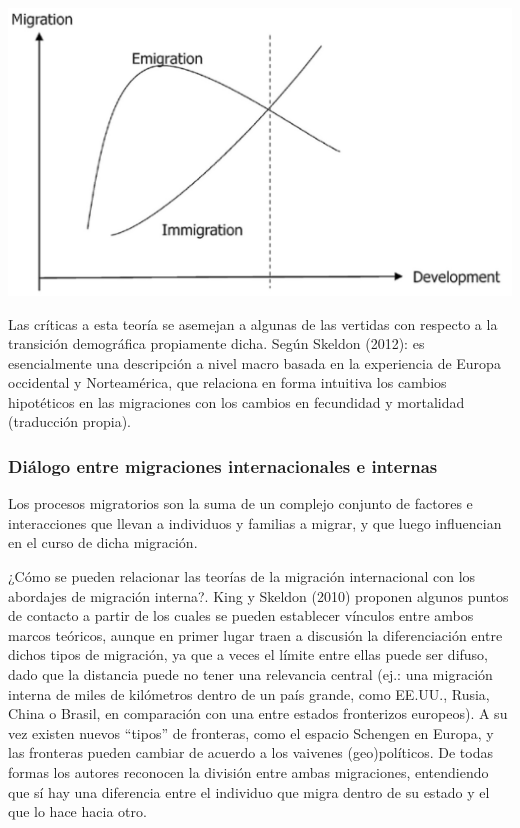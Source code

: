 \documentclass[12pt,spanish,]{article}
\let\origfigure\figure
\let\endorigfigure\endfigure
\renewenvironment{figure}[1][2] {
    \expandafter\origfigure\expandafter[H]
} {
    \endorigfigure
}
\begin{document}
\begin{figure}
\hypertarget{fig:trans_migra}{%
\centering
\includegraphics{./tex2pdf.-8c1f0593c1a83dbe/b95ff94df58c181782faebced34fbdcebfed67d6.jpg}
\caption{Transición migratoria (de Haas et~al.,
2015).}\label{fig:trans_migra}
}
\end{figure}

Las críticas a esta teoría se asemejan a algunas de las vertidas con
respecto a la transición demográfica propiamente dicha. Según Skeldon
(2012): es esencialmente una descripción a nivel macro basada en la
experiencia de Europa occidental y Norteamérica, que relaciona en forma
intuitiva los cambios hipotéticos en las migraciones con los cambios en
fecundidad y mortalidad (traducción propia).

\hypertarget{diuxe1logo-entre-migraciones-internacionales-e-internas}{%
\subsubsection{Diálogo entre migraciones internacionales e
internas}\label{diuxe1logo-entre-migraciones-internacionales-e-internas}}

Los procesos migratorios son la suma de un complejo conjunto de factores
e interacciones que llevan a individuos y familias a migrar, y que luego
influencian en el curso de dicha migración.

¿Cómo se pueden relacionar las teorías de la migración internacional con
los abordajes de migración interna?. King y Skeldon (2010) proponen
algunos puntos de contacto a partir de los cuales se pueden establecer
vínculos entre ambos marcos teóricos, aunque en primer lugar traen a
discusión la diferenciación entre dichos tipos de migración, ya que a
veces el límite entre ellas puede ser difuso, dado que la distancia
puede no tener una relevancia central (ej.: una migración interna de
miles de kilómetros dentro de un país grande, como EE.UU., Rusia, China
o Brasil, en comparación con una entre estados fronterizos europeos). A
su vez existen nuevos ``tipos'' de fronteras, como el espacio Schengen
en Europa, y las fronteras pueden cambiar de acuerdo a los vaivenes
(geo)políticos. De todas formas los autores reconocen la división entre
ambas migraciones, entendiendo que sí hay una diferencia entre el
individuo que migra dentro de su estado y el que lo hace hacia otro.
\end{document}
